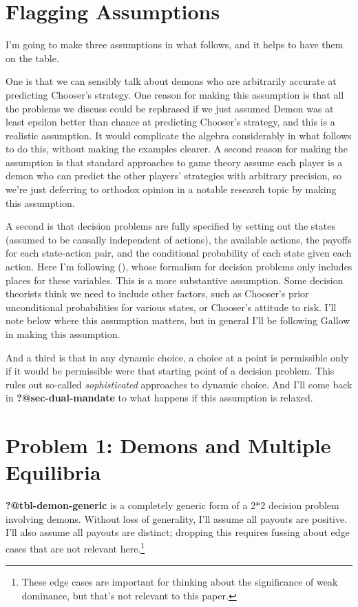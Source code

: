 \documentclass[
  10pt,
  letterpaper,
  DIV=11,
  numbers=noendperiod,
  twoside]{scrartcl}
\begin{document}
\section{Flagging Assumptions}\label{sec-flagging}

I'm going to make three assumptions in what follows, and it helps to
have them on the table.

One is that we can sensibly talk about demons who are arbitrarily
accurate at predicting Chooser's strategy. One reason for making this
assumption is that all the problems we discuss could be rephrased if we
just assumed Demon was at least epsilon better than chance at predicting
Chooser's strategy, and this is a realistic assumption. It would
complicate the algebra considerably in what follows to do this, without
making the examples clearer. A second reason for making the assumption
is that standard approaches to game theory assume each player is a demon
who can predict the other players' strategies with arbitrary precision,
so we're just deferring to orthodox opinion in a notable research topic
by making this assumption.

A second is that decision problems are fully specified by setting out
the states (assumed to be causally independent of actions), the
available actions, the payoffs for each state-action pair, and the
conditional probability of each state given each action. Here I'm
following (), whose
formalism for decision problems only includes places for these
variables. This is a more substantive assumption. Some decision
theorists think we need to include other factors, such as Chooser's
prior unconditional probabilities for various states, or Chooser's
attitude to risk. I'll note below where this assumption matters, but in
general I'll be following Gallow in making this assumption.

And a third is that in any dynamic choice, a choice at a point is
permissible only if it would be permissible were that starting point of
a decision problem. This rules out so-called \emph{sophisticated}
approaches to dynamic choice. And I'll come back in
\textbf{?@sec-dual-mandate} to what happens if this assumption is
relaxed.

\section{Problem 1: Demons and Multiple Equilibria}\label{sec-multiple}

\textbf{?@tbl-demon-generic} is a completely generic form of a 2*2
decision problem involving demons. Without loss of generality, I'll
assume all payouts are positive. I'll also assume all payouts are
distinct; dropping this requires fussing about edge cases that are not
relevant here.\footnote{These edge cases are important for thinking
  about the significance of weak dominance, but that's not relevant to
  this paper.}
\end{document}
